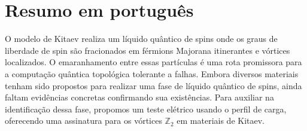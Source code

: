 \begin{absolutelynopagebreak}

\end{absolutelynopagebreak}


\clearpage

\chapter{Resumo em portugu\^{e}s}
O modelo de Kitaev realiza um l\'iquido qu\^antico de spins onde os graus de liberdade de spin s\~ao fracionados em f\'ermions Majorana itinerantes e v\'ortices localizados. O emaranhamento entre essas part\'iculas é uma rota promissora para a computa\c{c}\~ao qu\^antica topol\'ogica tolerante a falhas. Embora diversos materiais tenham sido propostos para realizar uma fase de l\'iquido qu\^antico de spins, ainda faltam evid\^encias concretas confirmando sua exist\^encias. Para auxiliar na identifica\c{c}\~ao dessa fase, propomos um teste el\'etrico usando o perfil de carga, oferecendo uma assinatura para os v\'ortices $\mathbb{Z}_2$ em materiais de Kitaev.

